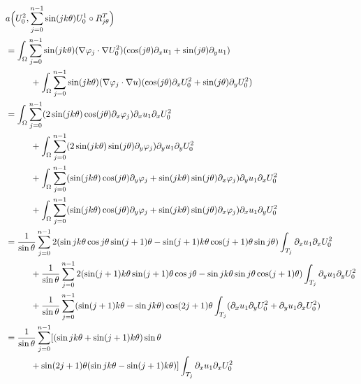 \vspace*{-1\baselineskip}
\bgroup\smaller
\begin{align*}
&a\Bigl(U_0^2,\sum_{j=0}^{n-1} \sin(jk\theta) U_0^1 \circ R_{j\theta}^T\Bigr)\\
&= \int_\Omega \sum_{j=0}^{n-1} \sin(jk\theta)(\nabla \varphi_j\cdot \nabla U_0^2)(\cos(j\theta) \partial_x u_1+\sin (j\theta)\partial_y u_1) \\
&\hspace*{1cm}+ \int_\Omega \sum_{j=0}^{n-1}\sin(jk\theta) (\nabla \varphi_j\cdot \nabla u)(\cos(j\theta) \partial_x U_0^2 +\sin(j\theta) \partial_y U_0^2) \\
&= \int_\Omega \sum_{j=0}^{n-1} (2 \sin(jk\theta)\cos(j\theta)\partial_x \varphi_j) \partial_x u_1 \partial_x U_0^2 \\
&\hspace*{1cm}+ \int_\Omega \sum_{j=0}^{n-1}(2\sin(jk\theta)\sin(j\theta)\partial_y \varphi_j) \partial_y u_1 \partial_y U_0^2 \\
&\hspace*{1cm}+ \int_\Omega \sum_{j=0}^{n-1} (\sin(jk\theta)\cos(j\theta)\partial_y \varphi_j+\sin(jk\theta)\sin(j\theta)\partial_x \varphi_j) \partial_y u_1 \partial_x U_0^2 \\
&\hspace*{1cm}+ \int_\Omega \sum_{j=0}^{n-1} (\sin(jk\theta)\cos(j\theta)\partial_y \varphi_j+\sin(jk\theta)\sin(j\theta)\partial_x \varphi_j) \partial_x u_1 \partial_y U_0^2\\
&=\frac{1}{\sin \theta}\sum_{j=0}^{n-1}2 (\sin jk\theta \cos j \theta \sin(j+1)\theta -\sin(j+1)k\theta \cos (j+1)\theta \sin j\theta) \int_{T_j} \partial_x u_1 \partial_x U_0^2\\
&\hspace*{1cm}+\frac{1}{\sin \theta}\sum_{j=0}^{n-1} 2(\sin(j+1)k\theta \sin(j+1)\theta \cos j \theta-\sin jk\theta \sin j \theta \cos(j+1)\theta)\int_{T_j} \partial_y u_1 \partial_y U_0^2\\
&\hspace*{1cm}+\frac{1}{\sin \theta}\sum_{j=0}^{n-1} (\sin(j+1)k\theta-\sin jk\theta)\cos(2j+1)\theta
\int_{T_j} (\partial_x u_1 \partial_y U_0^2 + \partial_y u_1 \partial_x U_0^2)\\
&=\frac{1}{\sin \theta}\sum_{j=0}^{n-1}[ (\sin jk\theta + \sin(j+1)k\theta)\sin \theta\\
&\hspace*{1cm}+ \sin (2j+1)\theta (\sin jk\theta -\sin(j+1)k\theta) ]\int_{T_j} \partial_x u_1 \partial_x U_0^2\\

\end{align*}
